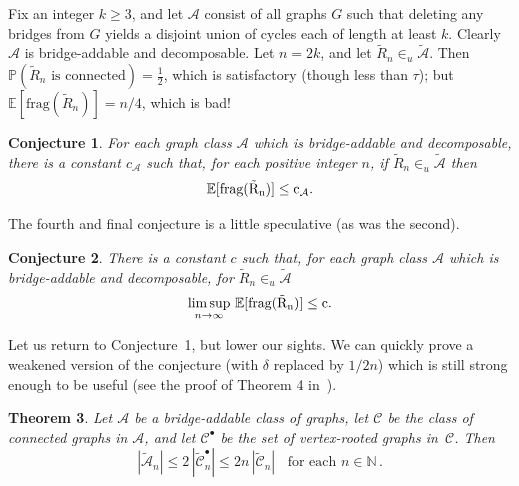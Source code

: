 \documentclass[12pt]{article}
\newcommand{\cA}{\mathcal A}
\newcommand{\cC}{\mathcal C}
\newcommand{\pr}{{\mathbb P}}
\newcommand{\E}{{\mathbb E}}
\newcommand{\N}{\mathbb{N}}
\newcommand{\frag}{\rm frag}
\newtheorem{theorem}{Theorem}
\newtheorem{conjecture}[theorem]{Conjecture}
\begin{document}
Fix an integer $k \geq 3$, and let $\cA$ consist of all graphs $G$ such that deleting any bridges from $G$ yields a disjoint union of cycles each of length at least $k$.  Clearly $\cA$ is bridge-addable and decomposable.  Let $n=2k$, and let $\tilde{R}_n \in_u \tilde{\cA}$.  Then $\pr(\tilde{R}_n \mbox{ is connected})= \frac12$, which is satisfactory (though less than $\tau$); but $\E[\mbox{frag}(\tilde{R}_n)]=n/4$, which is bad!

\begin{conjecture} \label{conj.3}
For each graph class $\cA$ which is bridge-addable and decomposable, there is a constant $c_{\cA}$ such that, for each positive integer $n$, if $\tilde{R}_n \in_u \tilde{\cA}$ then 
\[ \E[ \frag(\tilde{R}_n)] \leq c_{\cA}.\]
\end{conjecture}
\smallskip

The fourth and final conjecture is a little speculative (as was the second).

%
\begin{conjecture} \label{conj.4}
There is a constant $c$ such that, for each graph class $\cA$ which is bridge-addable and decomposable,
for $\tilde{R}_n \in_u \tilde{\cA}$ 
\[ \limsup_{n \to \infty} \, \E[ \frag(\tilde{R}_n)] \leq c.\]
\end{conjecture}
\bigskip

Let us return to Conjecture~1, but lower our sights.  We can quickly prove a weakened version of the conjecture (with $\delta$ replaced by $1/2n$) which is still strong enough to be useful (see the proof of Theorem 4 in~\cite{ms2020}).


\begin{theorem} \label{thm.uconn}
Let $\cA$ be a bridge-addable class of graphs, let $\cC$ be the class of connected graphs in $\cA$, and let ${\cC}^{\bullet}$ be the set of vertex-rooted graphs in~${\cC}$. Then 
\begin{equation} \label{eqn.ubadd}
|\widetilde{\cA}_n | \leq 2\, |\widetilde{\cC}^{\bullet}_n | \leq  2n\, |\widetilde{\cC}_n |  \;\; \mbox{ for each } n \in \N \, .
\end{equation}
\end{theorem}
\end{document}
